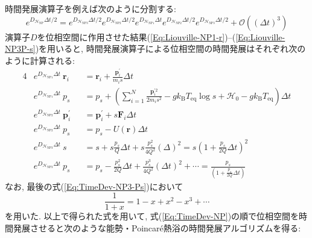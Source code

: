 時間発展演算子を例えば次のように分割する:
\begin{equation}
  e^{D_{\mathcal{H}_{\mathrm{NP}}}\Delta t/2}
  =
  e^{D_{\mathcal{H}_{\mathrm{NP3}}}\Delta t/2}
  e^{D_{\mathcal{H}_{\mathrm{NP2}}}\Delta t/2}
  e^{D_{\mathcal{H}_{\mathrm{NP1}}}\Delta t}
  e^{D_{\mathcal{H}_{\mathrm{NP2}}}\Delta t/2}
  e^{D_{\mathcal{H}_{\mathrm{NP3}}}\Delta t/2}
  +
  \mathcal{O}((\Delta t)^{3})
  \label{Eq:TimeDev-NP}
\end{equation}
演算子$D$を位相空間に作用させた結果(\ref{Eq:Liouville-NP1-r})--(\ref{Eq:Liouville-NP3P-s})を用いると, 時間発展演算子による位相空間の時間発展はそれぞれ次のように計算される:
\begin{alignat}{4}
  &e^{D_{\mathcal{H}_{\mathrm{NP1}}}\Delta t} ~ \bm{r}_{i}
  &&=
  \bm{r}_{i}
  +
  \frac{\bm{p}_{i}^{\prime}}{m_{i}s} \Delta t
  \label{Eq:TimeDev-NP1-r} \\
  &e^{D_{\mathcal{H}_{\mathrm{NP1}}}\Delta t} ~ p_{s}
  &&=
  p_{s}
  +
  \left(
    \sum_{i=1}^{N}
    \frac{\bm{p}_{i}^{\prime 2}}{2m_{i}s^{2}}
    -
    g k_{\mathrm{B}} T_{\mathrm{eq}} \log s
    +
    \mathcal{H}_{0}
    -
    g k_{\mathrm{B}} T_{\mathrm{eq}}
  \right)
  \Delta t
  \label{Eq:TimeDev-NP1-Ps} \\
  &e^{D_{\mathcal{H}_{\mathrm{NP2}}}\Delta t} ~ \bm{p}_{i}^{\prime}
  &&=
  \bm{p}_{i}^{\prime}
  +
  s \bm{F}_{i} \Delta t
  \label{Eq:TimeDev-NP2-p} \\
  &e^{D_{\mathcal{H}_{\mathrm{NP2}}}\Delta t} ~ p_{s}
  &&=
  p_{s} - U(\bm{r}) \Delta t
  \label{Eq:TimeDev-NP2-Ps} \\
  &e^{D_{\mathcal{H}_{\mathrm{NP3}}}\Delta t} ~ s
  &&=
  s + s \frac{p_{s}}{Q} \Delta t + s \frac{p_{s}^{2}}{4Q^2} (\Delta)^{2}
  =
  s \left(1 + \frac{p_{s}}{2Q} \Delta t \right)^{2}
  \label{Eq:TimeDev-NP3-s} \\
  &e^{D_{\mathcal{H}_{\mathrm{NP3}}}\Delta t} ~ p_{s}
  &&=
  p_{s} - \frac{p_{s}^{2}}{2Q} \Delta t + \frac{p_{s}^{3}}{4Q^{2}} (\Delta t)^{2}
  + \cdots
  =
  \frac{p_{s}}{(1 + \frac{p_{s}}{2Q}\Delta t)}
  \label{Eq:TimeDev-NP3-Ps}
\end{alignat}
なお, 最後の式(\ref{Eq:TimeDev-NP3-Ps})において
\begin{equation}
  \frac{1}{1+x} = 1 - x + x^2 - x^3 + \cdots
\end{equation}
を用いた. 以上で得られた式を用いて, 式(\ref{Eq:TimeDev-NP})の順で位相空間を時間発展させると次のような能勢・Poincar\'{e}熱浴の時間発展アルゴリズムを得る:
